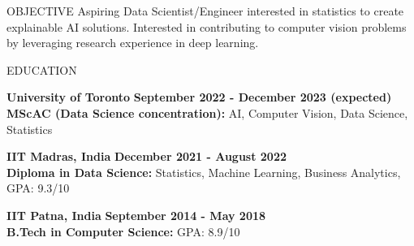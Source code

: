 \documentclass{resume}
\begin{document}
  \begin{rSection}{OBJECTIVE}
    Aspiring Data Scientist/Engineer interested in statistics to create explainable AI solutions.
    Interested in contributing to computer vision problems by leveraging research experience in deep learning.
  \end{rSection}

  \begin{rSection}{EDUCATION}

    {\bf University of Toronto} \hfill {\bf September 2022 - December 2023 (expected)} \\
    {\bf MScAC (Data Science concentration):} AI, Computer Vision, Data Science, Statistics

    {\bf IIT Madras, India} \hfill {\bf December 2021 - August 2022} \\
    {\bf Diploma in Data Science:} Statistics, Machine Learning, Business Analytics, GPA: 9.3/10

    {\bf IIT Patna, India} \hfill {\bf September 2014 - May 2018} \\
    {\bf B.Tech in Computer Science:} GPA: 8.9/10

  \end{rSection}
\end{document}

